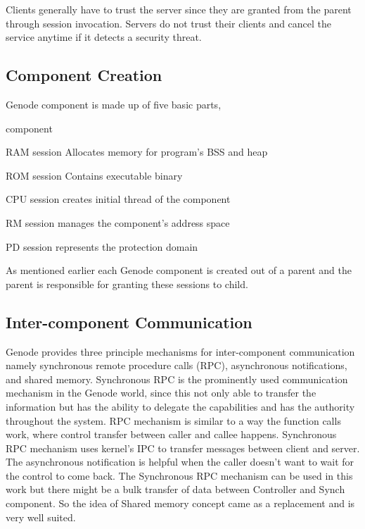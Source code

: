 Clients generally have to trust the server since they are granted from the parent through session invocation. Servers do not trust their clients and cancel the service anytime if it detects a security threat.

 
\subsection{Component Creation}
Genode component is made up of five basic parts, 

\begin{labeling}{component}
\item[RAM session] Allocates memory for program's BSS and heap
\item[ROM session] Contains executable binary
\item[CPU session] creates initial thread of the component
\item[RM session] manages the component's address space 
\item[PD session] represents the protection domain
\end{labeling}

As mentioned earlier each Genode component is created out of a parent and the parent is responsible for granting these sessions to child. 

\subsection{Inter-component Communication}\label{Foundations:icc}
Genode provides three principle mechanisms for inter-component communication namely synchronous remote procedure calls (RPC), asynchronous notifications, and
shared memory. Synchronous RPC is the prominently used communication mechanism in the Genode world, since this not only able to transfer the information but has the ability to delegate the capabilities and has the authority throughout the system. 
RPC mechanism is similar to a way the function calls work, where control transfer between caller and callee happens. Synchronous RPC mechanism uses kernel's IPC to transfer messages between client and server. The asynchronous notification is helpful when the caller doesn't want to wait for the control to come back. The Synchronous RPC mechanism can be used in this work but there might be a bulk transfer of data between Controller and Synch component. So the idea of Shared memory concept came as a replacement and is very well suited.

